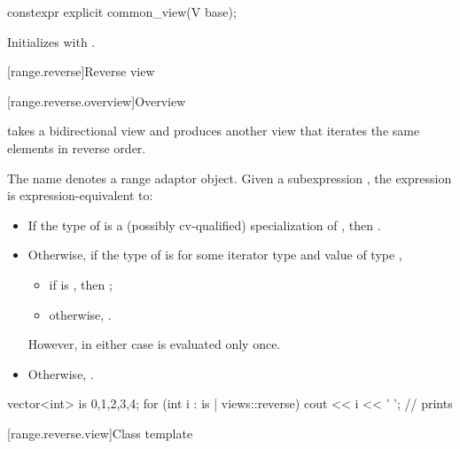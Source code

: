 %
\begin{itemdecl}
constexpr explicit common_view(V base);
\end{itemdecl}

\begin{itemdescr}
\pnum
\effects
Initializes  with .
\end{itemdescr}

[range.reverse]{Reverse view}

[range.reverse.overview]{Overview}

\pnum
{} takes a bidirectional view and produces
another view that iterates the same elements in reverse order.

\pnum
{}%
The name  denotes a
range adaptor object.
Given a subexpression , the expression
 is expression-equivalent to:
\begin{itemize}
\item
  If the type of  is
  a (possibly cv-qualified) specialization of ,
  then .
\item
  Otherwise, if the type of  is \cv{} 
  for some iterator type  and
  value  of type ,
  \begin{itemize}
  \item
    if  is , then
;
  \item
    otherwise, .
  \end{itemize}
  However, in either case  is evaluated only once.
\item
  Otherwise, .
\end{itemize}

\pnum
\begin{example}
\begin{codeblock}
vector<int> is {0,1,2,3,4};
for (int i : is | views::reverse)
  cout << i << ' '; // prints 
\end{codeblock}
\end{example}

[range.reverse.view]{Class template }


